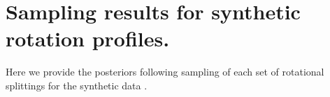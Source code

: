 
\chapter*{Sampling results for synthetic rotation profiles.}
\label{apndx:rot_split_apnx}

Here we provide the posteriors following sampling of each set of rotational splittings for the synthetic data .



